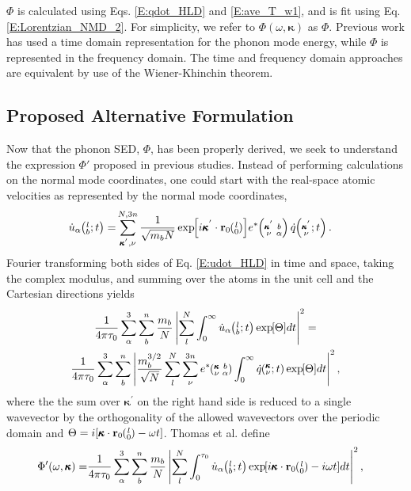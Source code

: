 \documentclass[letterpaper,12pt]{article}
\newcommand{\EXP}[1]{\exp\mspace{-5.0mu}\left[#1\right]\mspace{-3.0mu}}
\newcommand{\SUMprime}[2]{\ifthenelse{\equal{#1}{0}}{\sum_{\alpha_{#2},b_{#2},l_{#2}}^{3,n,N}} {\ifthenelse{\equal{#1}{1}}{\sum_{\alpha_{#2},b_{#2}}^{3,n}}{\sum_{\pmb{\kappa}^{'}#2,\nu#2}^{N,3n}}}}
\newcommand{\ab}[2]{\mspace{-4.0mu}\left(\mspace{-8.0mu}\begin{smallmatrix}&\ifthenelse{\equal{#1}{}}{a}{#1} \\&\ifthenelse{\equal{#2}{}}{b}{#2}\end{smallmatrix}\mspace{-3.0mu}\right)}
\newcommand{\kvba}{\mspace{-4.0mu}\left(\mspace{-8.0mu}\begin{smallmatrix} &\pmb{\kappa} &b \\ &\nu &\alpha\end{smallmatrix}\mspace{-3.0mu}\right)}
\newcommand{\kpvba}{\mspace{-4.0mu}\left(\mspace{-8.0mu}\begin{smallmatrix} &\pmb{\kappa}^{'} &b \\ &\nu &\alpha\end{smallmatrix}\mspace{-3.0mu}\right)}
\newcommand{\kvt}{\mspace{-4.0mu}\left(\mspace{-8.0mu}\begin{smallmatrix}&\pmb{\kappa} \\&\nu\end{smallmatrix}\mspace{-2.0mu};t\right)}
\newcommand{\kpvt}{\mspace{-4.0mu}\left(\mspace{-8.0mu}\begin{smallmatrix}&\pmb{\kappa}^{'} \\&\nu\end{smallmatrix}\mspace{-2.0mu};t\right)}
\newcommand{\lbt}{\mspace{-4.0mu}\left(\mspace{-8.0mu}\begin{smallmatrix}&l \\&b\end{smallmatrix}\mspace{-2.0mu};t\right)}
\begin{document}
$\Phi$ is calculated using Eqs$.$ \eqref{E:qdot_HLD} and \eqref{E:ave_T_w1}, and is fit using Eq$.$ \eqref{E:Lorentzian_NMD_2}. For simplicity, we refer to $\Phi(\omega,\pmb{\kappa})$ as $\Phi$. Previous work has used a time domain representation for the phonon mode energy, while $\Phi$ is represented in the frequency domain.\cite{mcgaughey2004c,turney2009a,shiomi2011b} The time and frequency domain approaches are equivalent by use of the Wiener-Khinchin theorem.\cite{shiomi2011b,rudin1987}

\subsection{\label{S:Subsection_Proposed_SED}Proposed Alternative Formulation}

Now that the phonon SED, $\Phi$, has been properly derived, we seek to understand the expression $\Phi'$ proposed in previous studies.\cite{maruyama2003,thomas2010c} Instead of performing calculations on the normal mode coordinates, one could start with the real-space atomic velocities as represented by the normal mode coordinates,\cite{dove1993}
\begin{equation}\label{E:udot_HLD}
\begin{split}
\dot{u}_{\alpha}\lbt = &\SUMprime{2}{} \frac{1}{\sqrt{m_bN}} \EXP{i\pmb{\kappa}^{'}\cdot\mathbf{r}_0\ab{l}{0}} e^*\kpvba \dot{q}\kpvt{}{}{}.
\end{split}
\end{equation}
Fourier transforming both sides of Eq$.$ \eqref{E:udot_HLD} in time and space, taking the complex modulus, and summing over the atoms in the unit cell and the Cartesian directions yields
\begin{multline}\label{SED}
\frac{1}{4\pi\tau_0} \sum_\alpha^3 \sum_b^n \frac{m_b}{N} \left\lvert \sum_l^N  \int_{0}^{\infty} \dot{u}_{\alpha}\lbt \EXP{\Theta} dt \right\rvert^2 =
\\ \frac{1}{4\pi\tau_0} \sum_\alpha^3 \sum_b^n \left\lvert \frac{m_b^{3/2}}{\sqrt{N}} \sum_l^N \sum_{\nu}^{3n} e^*\kvba \int_{0}^{\infty}\dot{q}\kvt\EXP{\Theta}dt \right\rvert^2 ,
\end{multline}
where the the sum over $\pmb{\kappa}^{'}$ on the right hand side is reduced to a single wavevector by the orthogonality of the allowed wavevectors over the periodic domain and $\Theta = i[\pmb{\kappa}\cdot\mathbf{r}_0\ab{l}{0}-\omega t]$. Thomas et al. \cite{thomas2010c} define
\begin{equation}\label{Lorentzian_SED}
\begin{split}
\Phi'(\omega,\pmb{\kappa}) =& \frac{1}{4\pi\tau_0} \sum_\alpha^3 \sum_b^n \frac{m_b}{N}\left| \sum_l^N  \int_{0}^{\tau_0} \dot{u}_{\alpha}\lbt \EXP{i\pmb{\kappa}\cdot\mathbf{r}_0\ab{l}{0}-i\omega t} dt \right|^2,
\end{split}
\end{equation}
\end{document}
